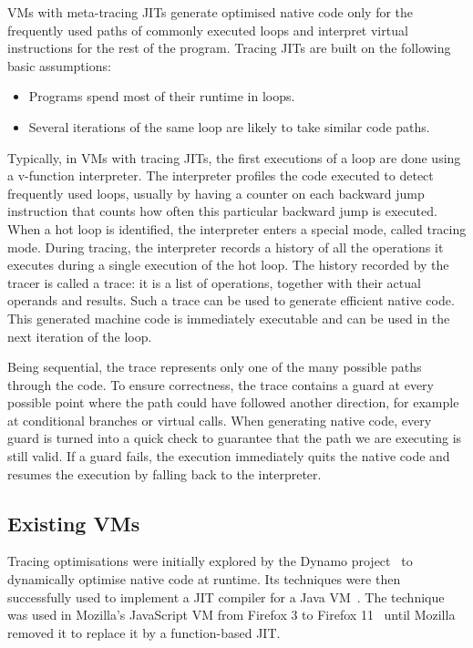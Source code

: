 \documentclass[a4paper,12pt,twoside]{../includes/ThesisStyle}
\begin{document}
VMs with meta-tracing JITs generate optimised native code only for the frequently used paths of commonly executed loops and interpret virtual instructions for the rest of the program. Tracing JITs are built on the following basic assumptions:
\begin{itemize}
	\item Programs spend most of their runtime in loops.
	\item Several iterations of the same loop are likely to take similar code paths.
\end{itemize}

Typically, in VMs with tracing JITs, the first executions of a loop are done using a v-function interpreter. The interpreter profiles the code executed to detect frequently used loops, usually by having a counter on each backward jump instruction that counts how often this particular backward jump is executed. When a hot loop is identified, the interpreter enters a special mode, called tracing mode. During tracing, the interpreter records a history of all the operations it executes during a single execution of the hot loop. The history recorded by the tracer is called a trace: it is a list of operations, together with their actual operands and results. Such a trace can be used to generate efficient native code. This generated machine code is immediately executable and can be used in the next iteration of the loop.

Being sequential, the trace represents only one of the many possible paths through the code. To ensure correctness, the trace contains a guard at every possible point where the path could have followed another direction, for example at conditional branches or virtual calls. When generating native code, every guard is turned into a quick check to guarantee that the path we are executing is still valid. If a guard fails, the execution immediately quits the native code and resumes the execution by falling back to the interpreter.

\subsection{Existing VMs}
\label{sec:existing2}

Tracing optimisations were initially explored by the Dynamo project~\cite{Bala00a} to dynamically optimise native code at runtime. Its techniques were then successfully used to implement a JIT compiler for a Java VM~\cite{Gal06a}. The technique was used in Mozilla's JavaScript VM from Firefox 3 to Firefox 11~\cite{Gal09a} until Mozilla removed it to replace it by a function-based JIT. 
\end{document}
